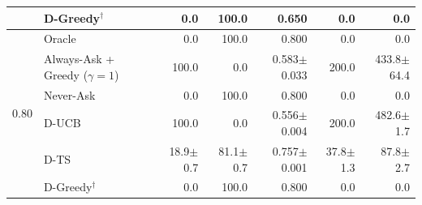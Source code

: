 \begin{tabular}{llrrrrr}
 & D-Greedy$^\dagger$ & 0.0 & 100.0 & 0.650 & 0.0 & 0.0 \\
\midrule
\multirow{6}{*}{0.80} & Oracle & 0.0 & 100.0 & 0.800 & 0.0 & 0.0 \\
 & Always-Ask + Greedy ($\gamma{=}1$) & 100.0 & 0.0 & 0.583{\scriptsize$\pm$0.033} & 200.0 & 433.8{\scriptsize$\pm$64.4} \\
 & Never-Ask & 0.0 & 100.0 & 0.800 & 0.0 & 0.0 \\
 & D-UCB & 100.0 & 0.0 & 0.556{\scriptsize$\pm$0.004} & 200.0 & 482.6{\scriptsize$\pm$1.7} \\
 & D-TS & 18.9{\scriptsize$\pm$0.7} & 81.1{\scriptsize$\pm$0.7} & 0.757{\scriptsize$\pm$0.001} & 37.8{\scriptsize$\pm$1.3} & 87.8{\scriptsize$\pm$2.7} \\
 & D-Greedy$^\dagger$ & 0.0 & 100.0 & 0.800 & 0.0 & 0.0 \\
\bottomrule
\end{tabular}
